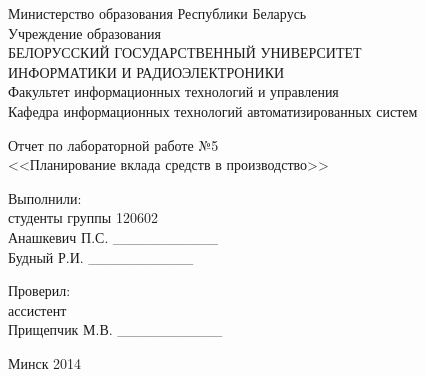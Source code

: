 
\thispagestyle{empty}

\begin{center}
  Министерство образования Республики Беларусь \\
  \vspace{0.5ex}
  Учреждение образования \\
  БЕЛОРУССКИЙ ГОСУДАРСТВЕННЫЙ УНИВЕРСИТЕТ \\
  ИНФОРМАТИКИ И РАДИОЭЛЕКТРОНИКИ \\
  \vspace{0.5ex}
  Факультет информационных технологий и управления \\
  \vspace{0.5ex}
  Кафедра информационных технологий автоматизированных систем
\end{center}

\vspace{50mm}

\begin{center}
  Отчет по лабораторной работе №5 \\
  <<Планирование вклада средств в производство>>
\end{center}

\vspace{30mm}

\begin{flushleft}

  Выполнили: \\
  студенты группы 120602 \\
  Анашкевич П.С. \_\_\_\_\_\_\_\_\_\_ \\
  Будный Р.И. \hspace{8mm} \_\_\_\_\_\_\_\_\_\_

  \vspace{5mm}

  Проверил: \\
  ассистент \\
  Прищепчик М.В. \_\_\_\_\_\_\_\_\_\_

\end{flushleft}

\vspace{45mm}
\begin{center}
  Минск 2014
\end{center}

\newpage
